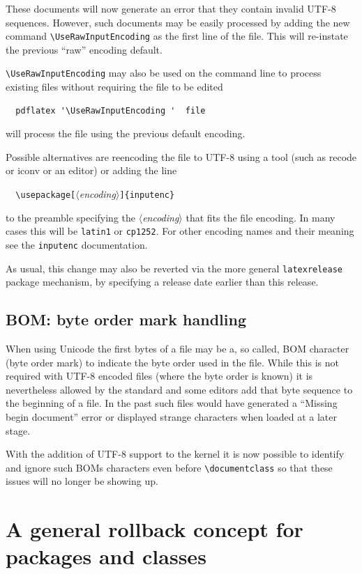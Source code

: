 \documentclass{ltnews}
\providecommand\meta[1]{$\langle$\textit{#1}$\rangle$}
\providecommand\pkg[1]{\texttt{#1}}
\providecommand\option[1]{\texttt{#1}}
\begin{document}
These documents will now generate an error that they contain invalid
UTF-8 sequences.  However, such documents may be easily processed by
adding the new command \verb|\UseRawInputEncoding| as the first line
of the file. This will re-instate the previous ``raw'' encoding
default.

\verb|\UseRawInputEncoding| may also be used on the command line to
process existing files without requiring the file to be edited
\begin{verbatim}
  pdflatex '\UseRawInputEncoding '  file
\end{verbatim}
will process the file using the previous default encoding.

Possible alternatives are reencoding the file to UTF-8 using a tool
(such as recode or iconv or an editor) or adding the line
\begin{flushleft}
\verb=  \usepackage[=\meta{encoding}\verb=]{inputenc}=
\end{flushleft}
to the preamble specifying the \meta{encoding} that fits the file
encoding.  In many cases this will be \option{latin1} or
\option{cp1252}. For other encoding names and their meaning see the
\pkg{inputenc} documentation.

As usual, this change may also be reverted via the more general
\pkg{latexrelease} package mechanism, by specifying a release date
earlier than this release.


\subsection{BOM: byte order mark handling}

When using Unicode the first bytes of a file may be a, so called, BOM
character (byte order mark) to indicate the byte order used in the
file. While this is not required with UTF-8 encoded files (where the
byte order is known) it is nevertheless allowed by the standard and
some editors add that byte sequence to the beginning of a file. In the
past such files would have generated a ``Missing begin document''
error or displayed strange characters when loaded at a later stage.

With the addition of UTF-8 support to the kernel it is now possible to
identify and ignore such BOMs characters even before
\verb=\documentclass= so that these issues will no longer be showing
up.



\section[A general rollback concept]
        {A general rollback concept for packages and classes}
\end{document}
